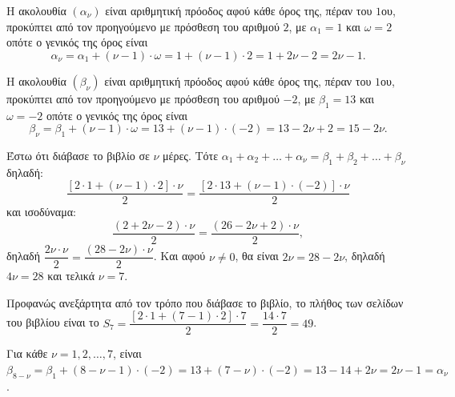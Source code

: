 
\begin{alist}
\item 
\begin{rlist}
\item Η ακολουθία $(\alpha_\nu)$ είναι αριθμητική πρόοδος αφού κάθε όρος της, πέραν του
$1$ου, προκύπτει από τον προηγούμενο με πρόσθεση του αριθμού $2$, με $\alpha_1 = 1$
και $\omega = 2$ οπότε ο γενικός της όρος είναι
\[\alpha_\nu = \alpha_1 + (\nu -1) \cdot \omega = 1 + (\nu -1) \cdot 2 = 1 + 2\nu - 2 = 2\nu - 1.\]
\item Η ακολουθία $(\beta_\nu)$ είναι αριθμητική πρόοδος αφού κάθε όρος της, πέραν του
$1$ου, προκύπτει από τον προηγούμενο με πρόσθεση του αριθμού $-2$, με $\beta_1 = 13$
και $\omega = -2$ οπότε ο γενικός της όρος είναι
\[\beta_\nu = \beta_1 + (\nu -1) \cdot \omega = 13 + (\nu -1) \cdot (-2) = 13 - 2\nu + 2 = 15 - 2\nu.\]
\end{rlist}

\item Έστω ότι διάβασε το βιβλίο σε $\nu$ μέρες. Τότε $\alpha_1 + \alpha_2 + \dots + \alpha_\nu = \beta_1 + \beta_2 + \dots + \beta_\nu$
δηλαδή:
\[\dfrac{[2 \cdot 1 + (\nu -1) \cdot 2] \cdot \nu}{2} = \dfrac{[2 \cdot 13 + (\nu -1) \cdot (-2)] \cdot \nu}{2}\]
και ισοδύναμα:
\[\dfrac{(2 + 2\nu - 2) \cdot \nu}{2} = \dfrac{(26 - 2\nu + 2) \cdot \nu}{2},\]
δηλαδή $\dfrac{2\nu \cdot \nu}{2} = \dfrac{(28 - 2\nu) \cdot \nu}{2}$.
Και αφού $\nu \ne 0$, θα είναι $2\nu = 28 - 2\nu$, δηλαδή $4\nu = 28$ και τελικά $\nu = 7$.

\item Προφανώς ανεξάρτητα από τον τρόπο που διάβασε το βιβλίο, το πλήθος των
σελίδων του βιβλίου είναι το $S_7 = \dfrac{[2 \cdot 1 + (7 -1) \cdot 2] \cdot 7}{2} = \dfrac{14 \cdot 7}{2} = 49$.

\item Για κάθε $\nu = 1, 2, \dots, 7$,
είναι $\beta_{8-\nu} = \beta_1 + (8 - \nu - 1) \cdot (-2) = 13 + (7 - \nu) \cdot (-2) = 13 - 14 + 2\nu = 2\nu - 1 = \alpha_\nu$.
\end{alist}

